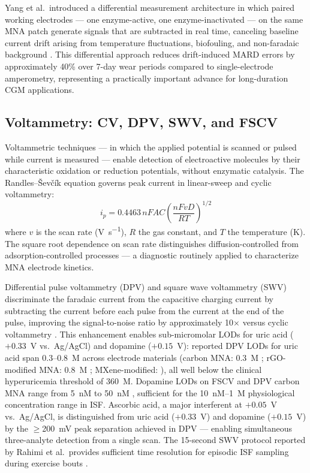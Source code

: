 \documentclass[review,1p]{elsarticle}
\begin{document}
Yang et al.\ introduced a differential measurement architecture in which paired working electrodes — one enzyme-active, one enzyme-inactivated — on the same MNA patch generate signals that are subtracted in real time, canceling baseline current drift arising from temperature fluctuations, biofouling, and non-faradaic background \cite{Yang2024Differential}. This differential approach reduces drift-induced MARD errors by approximately 40\% over 7-day wear periods compared to single-electrode amperometry, representing a practically important advance for long-duration CGM applications.

\subsection{Voltammetry: CV, DPV, SWV, and FSCV}
\label{subsec:voltammetry}

Voltammetric techniques — in which the applied potential is scanned or pulsed while current is measured — enable detection of electroactive molecules by their characteristic oxidation or reduction potentials, without enzymatic catalysis. The Randles--\v{S}ev\v{c}\'{i}k equation governs peak current in linear-sweep and cyclic voltammetry:
\begin{equation}
i_p = 0.4463\, nFAC\left(\frac{nFvD}{RT}\right)^{1/2}
\label{eq:randles_sevcik}
\end{equation}
where $v$ is the scan rate (V~s\textsuperscript{$-1$}), $R$ the gas constant, and $T$ the temperature (K). The square root dependence on scan rate distinguishes diffusion-controlled from adsorption-controlled processes — a diagnostic routinely applied to characterize MNA electrode kinetics.

Differential pulse voltammetry (DPV) and square wave voltammetry (SWV) discriminate the faradaic current from the capacitive charging current by subtracting the current before each pulse from the current at the end of the pulse, improving the signal-to-noise ratio by approximately 10$\times$ versus cyclic voltammetry \cite{Zhu2022UA}. This enhancement enables sub-micromolar LODs for uric acid ($+0.33$~V vs.\ Ag/AgCl) and dopamine ($+0.15$~V): reported DPV LODs for uric acid span 0.3--0.8~\textmu{}M across electrode materials (carbon MNA: 0.3~\textmu{}M \cite{Zhu2022UA}; rGO-modified MNA: 0.8~\textmu{}M \cite{Wang2023rGO}; MXene-modified: \cite{Yin2023UA}), all well below the clinical hyperuricemia threshold of 360~\textmu{}M. Dopamine LODs on FSCV and DPV carbon MNA range from 5~nM to 50~nM \cite{Rush2021FSCV}, sufficient for the 10~nM--1~\textmu{}M physiological concentration range in ISF. Ascorbic acid, a major interferent at $+0.05$~V vs.\ Ag/AgCl, is distinguished from uric acid ($+0.33$~V) and dopamine ($+0.15$~V) by the $\geq$200~mV peak separation achieved in DPV — enabling simultaneous three-analyte detection from a single scan. The 15-second SWV protocol reported by Rahimi et al.\ provides sufficient time resolution for episodic ISF sampling during exercise bouts \cite{Rahimi2023}.
\end{document}
